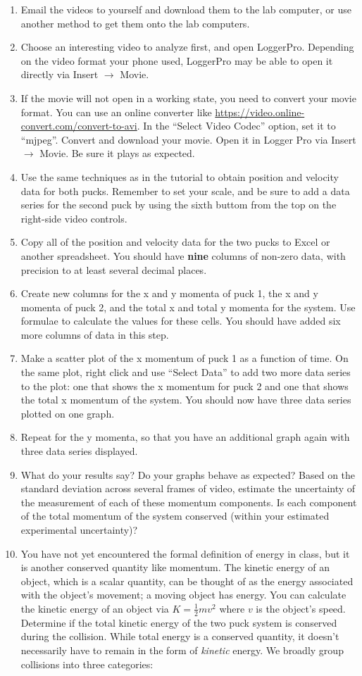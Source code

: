 \documentclass[10pt]{article}
\begin{document}
\begin{enumerate}
\item	Email the videos to yourself and download them to the lab computer, or use another method to get them onto the lab computers.
\item	Choose an interesting video to analyze first, and open LoggerPro. Depending on the video format your phone used, LoggerPro may be able to open it directly via Insert $\rightarrow$ Movie.
\item	If the movie will not open in a working state, you need to convert your movie format. You can use an online converter like \url{https://video.online-convert.com/convert-to-avi}. In the “Select Video Codec” option, set it to “mjpeg”. Convert and download your movie. Open it in Logger Pro via Insert $\rightarrow$ Movie. Be sure it plays as expected.
\item	Use the same techniques as in the tutorial to obtain position and velocity data for both pucks. Remember to set your scale, and be sure to add a data series for the second puck by using the sixth buttom from the top on the right-side video controls.
\item	Copy all of the position and velocity data for the two pucks to Excel or another spreadsheet. You should have \textbf{nine} columns of non-zero data, with precision to at least several decimal places.
\item 	Create new columns for the x and y momenta of puck 1, the x and y momenta of puck 2, and the total x and total y momenta for the system. Use formulae to calculate the values for these cells. You should have added six more columns of data in this step.
\item	Make a scatter plot of the x momentum of puck 1 as a function of time. On the same plot, right click and use “Select Data” to add two more data series to the plot: one that shows the x momentum for puck 2 and one that shows the total x momentum of the system. You should now have three data series plotted on one graph.
\item	Repeat for the y momenta, so that you have an additional graph again with three data series displayed.
\item What do your results say? Do your graphs behave as expected? Based on the standard deviation across several frames of video, estimate the uncertainty of the measurement of each of these momentum components.  Is each component of the total momentum of the system conserved (within your estimated experimental uncertainty)?
\item	You have not yet encountered the formal definition of energy in class, but it is another conserved quantity like momentum. The kinetic energy of an object, which is a scalar quantity, can be thought of as the energy associated with the object's movement; a moving object has energy. You can calculate the kinetic energy of an object via $K=\frac{1}{2}mv^2$ where $v$ is the object's speed. Determine if the total kinetic energy of the two puck system is conserved during the collision. While total energy is a conserved quantity, it doesn't necessarily have to remain in the form of \textit{kinetic} energy. We broadly group collisions into three categories:

\end{enumerate}
\end{document}
